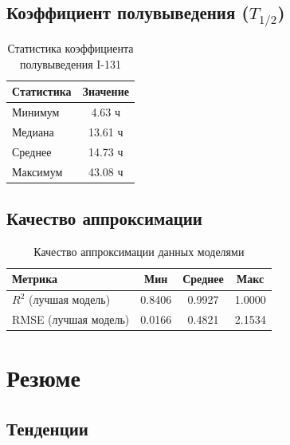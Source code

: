 \documentclass[12pt,a4paper]{article}
\begin{document}
\subsection{Коэффициент полувыведения ($T_{1/2}$)}

\begin{table}[H]
\centering
\begin{tabular}{lc}
\toprule
\textbf{Статистика} & \textbf{Значение} \\
\midrule
Минимум & 4.63 ч \\
Медиана & 13.61 ч \\
Среднее & 14.73 ч \\
Максимум & 43.08 ч \\
\bottomrule
\end{tabular}
\caption{Статистика коэффициента полувыведения I-131}
\end{table}

\subsection{Качество аппроксимации}

\begin{table}[H]
\centering
\begin{tabular}{lccc}
\toprule
\textbf{Метрика} & \textbf{Мин} & \textbf{Среднее} & \textbf{Макс} \\
\midrule
$R^2$ (лучшая модель) & 0.8406 & 0.9927 & 1.0000 \\
RMSE (лучшая модель) & 0.0166 & 0.4821 & 2.1534 \\
\bottomrule
\end{tabular}
\caption{Качество аппроксимации данных моделями}
\end{table}

\section{Резюме}

\subsection*{Тенденции}
\end{document}
